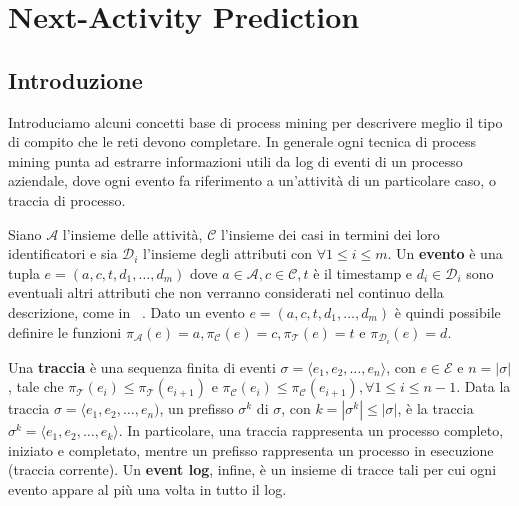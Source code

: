 \documentclass[12pt,a4paper]{report}
\begin{document}
    \section{Next-Activity Prediction}
    \subsection{Introduzione}
    Introduciamo alcuni concetti base di process mining per descrivere
    meglio il tipo di compito che le reti devono completare.
    In generale ogni tecnica di process mining punta ad estrarre
    informazioni utili da log di eventi di un processo aziendale,
    dove ogni evento fa riferimento a un'attivit\`a di un particolare
    caso, o traccia di processo.

    \smallskip
    Siano $\mathcal{A}$ l'insieme delle attivit\`a, $\mathcal{C}$ 
    l'insieme dei casi in termini dei loro identificatori e sia 
    $\mathcal{D}_i$ l'insieme degli attributi con $\forall 1\leq i\leq m$. 
    Un \textbf{evento} \`e una tupla $e=(a,c,t,d_1,\dots,d_m)$ dove 
    $a\in \mathcal{A}, c\in \mathcal{C}, t$ \`e il timestamp
    e $d_i\in \mathcal{D}_i$ sono eventuali altri attributi che non 
    verranno considerati nel continuo della descrizione, come in 
    ~\cite{10.1007/978-3-030-35166-3_25}. Dato un evento 
    $e=(a,c,t,d_1,\dots,d_m)$ \`e quindi possibile definire le funzioni
    $\pi_{\mathcal{A}}(e)=a,\pi_{\mathcal{C}}(e)=c,
    \pi_{\mathcal{T}}(e)=t$ e $\pi_{{\mathcal{D}}_i}(e)=d$.

    \smallskip
    Una \textbf{traccia} \`e una sequenza finita di eventi 
    $\sigma=\langle e_1, e_2, \dots, e_n\rangle$, con $e\in\mathcal{E}$ e
    $n=|\sigma|$, tale che $\pi_{\mathcal{T}}(e_i)\leq\pi_{\mathcal{T}}
    (e_{i+1})$ e $\pi_{\mathcal{C}}(e_i)\leq\pi_{\mathcal{C}}(e_{i+1}),
    \forall 1\leq i\leq n-1$. Data la traccia $\sigma=\langle
    e_1,e_2,\dots,e_n)$, un prefisso $\sigma^k$ di $\sigma$, con $k=|
    \sigma^k|\leq|\sigma|$, \`e la traccia $\sigma^k=\langle e_1,e_2,
    \dots,e_k\rangle$. In particolare, una traccia rappresenta un 
    processo completo, iniziato e completato, mentre un prefisso 
    rappresenta un processo in esecuzione (traccia corrente). Un 
    \textbf{event log}, infine, \`e un insieme di tracce tali per cui 
    ogni evento appare al pi\`u una volta in tutto il log.
\end{document}
